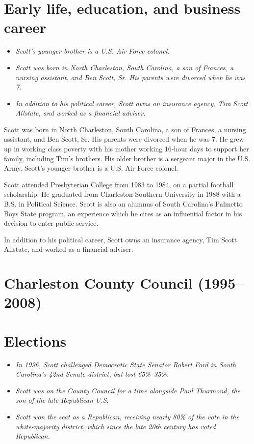 \section{Early life, education, and business
career}\label{early-life-education-and-business-career}

\begin{itemize}
\item
  \emph{Scott's younger brother is a U.S. Air Force colonel.}
\item
  \emph{Scott was born in North Charleston, South Carolina, a son of
  Frances, a nursing assistant, and Ben Scott, Sr. His parents were
  divorced when he was 7.}
\item
  \emph{In addition to his political career, Scott owns an insurance
  agency, Tim Scott Allstate, and worked as a financial adviser.}
\end{itemize}

Scott was born in North Charleston, South Carolina, a son of Frances, a
nursing assistant, and Ben Scott, Sr. His parents were divorced when he
was 7. He grew up in working class poverty with his mother working
16-hour days to support her family, including Tim's brothers. His older
brother is a sergeant major in the U.S. Army. Scott's younger brother is
a U.S. Air Force colonel.

Scott attended Presbyterian College from 1983 to 1984, on a partial
football scholarship. He graduated from Charleston Southern University
in 1988 with a B.S. in Political Science. Scott is also an alumnus of
South Carolina's Palmetto Boys State program, an experience which he
cites as an influential factor in his decision to enter public service.

In addition to his political career, Scott owns an insurance agency, Tim
Scott Allstate, and worked as a financial adviser.

\section{Charleston County Council
(1995--2008)}\label{charleston-county-council-19952008}

\section{Elections}\label{elections}

\begin{itemize}
\item
  \emph{In 1996, Scott challenged Democratic State Senator Robert Ford
  in South Carolina's 42nd Senate district, but lost 65\%--35\%.}
\item
  \emph{Scott was on the County Council for a time alongside Paul
  Thurmond, the son of the late Republican U.S.}
\item
  \emph{Scott won the seat as a Republican, receiving nearly 80\% of the
  vote in the white-majority district, which since the late 20th century
  has voted Republican.}
\end{itemize}

